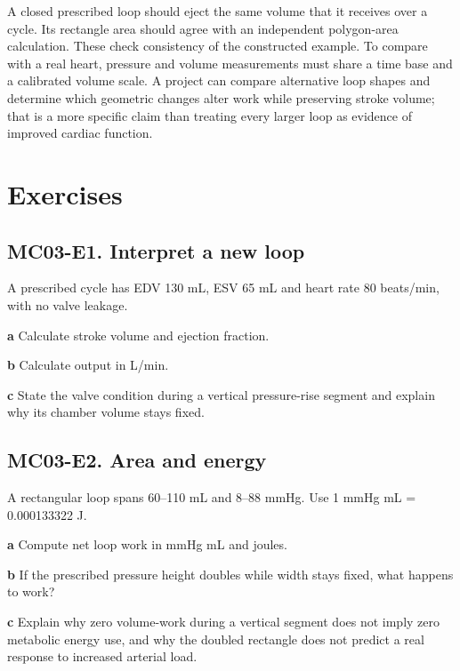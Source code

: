 \documentclass[11pt,letterpaper]{article}
\theoremstyle{definition}\newtheorem{definition}{Definition}\newtheorem{example}{Example}
\numberwithin{equation}{section}
\begin{document}
A closed prescribed loop should eject the same volume that it receives over a cycle. Its rectangle area should agree with an independent polygon-area calculation. These check consistency of the constructed example. To compare with a real heart, pressure and volume measurements must share a time base and a calibrated volume scale. A project can compare alternative loop shapes and determine which geometric changes alter work while preserving stroke volume; that is a more specific claim than treating every larger loop as evidence of improved cardiac function.
\bigskip
\section*{Exercises}
\par\noindent\begin{minipage}{\linewidth}
\subsection*{MC03-E1. Interpret a new loop}
A prescribed cycle has EDV 130 mL, ESV 65 mL and heart rate 80 beats/min, with no valve leakage.

\textbf{a} Calculate stroke volume and ejection fraction.

\end{minipage}\par\medskip
\textbf{b} Calculate output in L/min.

\textbf{c} State the valve condition during a vertical pressure-rise segment and explain why its chamber volume stays fixed.

\par\noindent\begin{minipage}{\linewidth}
\subsection*{MC03-E2. Area and energy}
A rectangular loop spans 60--110 mL and 8--88 mmHg. Use 1 mmHg mL =\allowbreak{} 0.000133322 J.

\textbf{a} Compute net loop work in mmHg mL and joules.

\end{minipage}\par\medskip
\textbf{b} If the prescribed pressure height doubles while width stays fixed, what happens to work?

\textbf{c} Explain why zero volume-work during a vertical segment does not imply zero metabolic energy use, and why the doubled rectangle does not predict a real response to increased arterial load.
\end{document}
